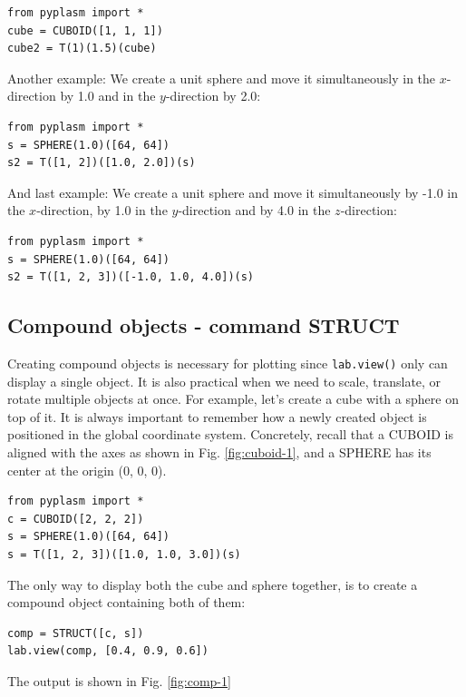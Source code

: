 \documentclass[article,A4,12pt]{llncs}
\begin{document}
\begin{verbatim}
from pyplasm import *
cube = CUBOID([1, 1, 1])
cube2 = T(1)(1.5)(cube)
\end{verbatim}
Another example: We create a unit sphere and move it simultaneously 
in the $x$-direction by 1.0 and in the $y$-direction by 2.0:

\begin{verbatim}
from pyplasm import *
s = SPHERE(1.0)([64, 64])
s2 = T([1, 2])([1.0, 2.0])(s)
\end{verbatim}
And last example: We create a unit sphere and  
move it simultaneously by -1.0 in the $x$-direction, by 1.0 in the $y$-direction
and by 4.0 in the $z$-direction:

\begin{verbatim}
from pyplasm import *
s = SPHERE(1.0)([64, 64])
s2 = T([1, 2, 3])([-1.0, 1.0, 4.0])(s)
\end{verbatim}

\subsection{Compound objects - command STRUCT}

Creating compound objects is necessary
for plotting since {\tt lab.view()} only can 
display a single object. It is also practical 
when we need to scale, translate, or rotate multiple objects at
once. For example, let's create a cube with a sphere on top of it.
It is always important to remember how a newly created
object is positioned in the global coordinate system. Concretely,
recall that 
a CUBOID is aligned with the axes as shown in Fig. \ref{fig:cuboid-1},
and a SPHERE has its center at the origin (0, 0, 0). 

\begin{verbatim}
from pyplasm import *
c = CUBOID([2, 2, 2])
s = SPHERE(1.0)([64, 64])
s = T([1, 2, 3])([1.0, 1.0, 3.0])(s)
\end{verbatim}
The only way to display both the cube and sphere together,
is to create a compound object containing both of them:

\begin{verbatim}
comp = STRUCT([c, s])
lab.view(comp, [0.4, 0.9, 0.6])
\end{verbatim}
The output is shown in Fig. \ref{fig:comp-1}

\newpage
\end{document}
